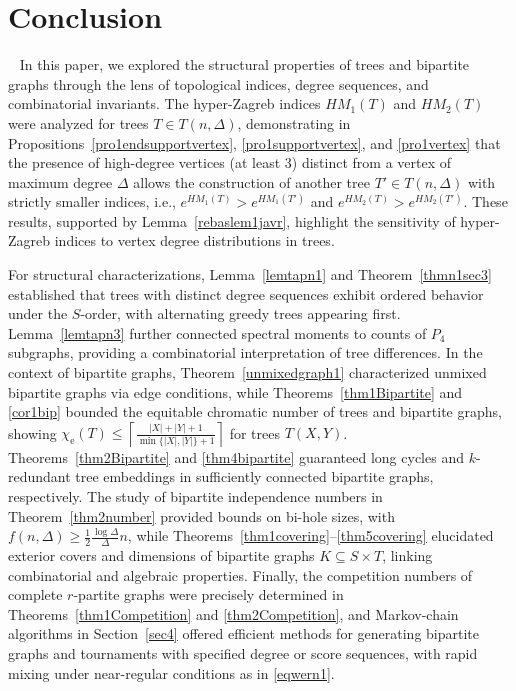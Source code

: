 \documentclass{article}
\theoremstyle{definition}
\begin{document}
\section{Conclusion}~\label{sec50000}
In this paper, we explored the structural properties of trees and bipartite graphs through the lens of topological indices, degree sequences, and combinatorial invariants. The hyper-Zagreb indices $HM_1(T)$ and $HM_2(T)$ were analyzed for trees $T \in T(n, \Delta)$, demonstrating in Propositions~\ref{pro1endsupportvertex}, \ref{pro1supportvertex}, and \ref{pro1vertex} that the presence of high-degree vertices (at least 3) distinct from a vertex of maximum degree $\Delta$ allows the construction of another tree $T' \in T(n, \Delta)$ with strictly smaller indices, i.e., $e^{HM_1(T)} > e^{HM_1(T')}$ and $e^{HM_2(T)} > e^{HM_2(T')}$. These results, supported by Lemma~\ref{rebaslem1javr}, highlight the sensitivity of hyper-Zagreb indices to vertex degree distributions in trees.

For structural characterizations, Lemma~\ref{lemtapn1} and Theorem~\ref{thmn1sec3} established that trees with distinct degree sequences exhibit ordered behavior under the $S$-order, with alternating greedy trees appearing first. Lemma~\ref{lemtapn3} further connected spectral moments to counts of $P_4$ subgraphs, providing a combinatorial interpretation of tree differences. In the context of bipartite graphs, Theorem~\ref{unmixedgraph1} characterized unmixed bipartite graphs via edge conditions, while Theorems~\ref{thm1Bipartite} and \ref{cor1bip} bounded the equitable chromatic number of trees and bipartite graphs, showing $\chi_{\mathrm{e}}(T) \leq \left\lceil \frac{|X| + |Y| + 1}{\min\{|X|,|Y|\} + 1} \right\rceil$ for trees $T(X,Y)$. Theorems~\ref{thm2Bipartite} and \ref{thm4bipartite} guaranteed long cycles and $k$-redundant tree embeddings in sufficiently connected bipartite graphs, respectively. The study of bipartite independence numbers in Theorem~\ref{thm2number} provided bounds on bi-hole sizes, with $f(n, \Delta) \geq \frac{1}{2} \frac{\log \Delta}{\Delta} n$, while Theorems~\ref{thm1covering}--\ref{thm5covering} elucidated exterior covers and dimensions of bipartite graphs $K \subseteq S \times T$, linking combinatorial and algebraic properties. Finally, the competition numbers of complete $r$-partite graphs were precisely determined in Theorems~\ref{thm1Competition} and \ref{thm2Competition}, and Markov-chain algorithms in Section~\ref{sec4} offered efficient methods for generating bipartite graphs and tournaments with specified degree or score sequences, with rapid mixing under near-regular conditions as in \eqref{eqwern1}.
\end{document}
